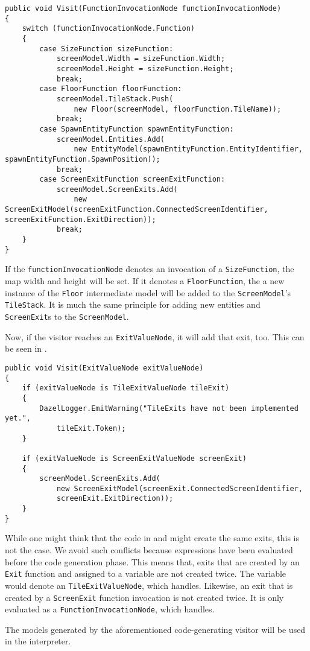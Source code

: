 \begin{lstlisting}[language=CSharp, caption={FunctionInvocationNode \texttt{Visit} method.}, label={lst:finVisitSG}]
public void Visit(FunctionInvocationNode functionInvocationNode)
{
    switch (functionInvocationNode.Function)
    {
        case SizeFunction sizeFunction:
            screenModel.Width = sizeFunction.Width;
            screenModel.Height = sizeFunction.Height;
            break;
        case FloorFunction floorFunction:
            screenModel.TileStack.Push(
                new Floor(screenModel, floorFunction.TileName));
            break;
        case SpawnEntityFunction spawnEntityFunction:
            screenModel.Entities.Add(
                new EntityModel(spawnEntityFunction.EntityIdentifier, spawnEntityFunction.SpawnPosition));
            break;
        case ScreenExitFunction screenExitFunction:
            screenModel.ScreenExits.Add(
                new ScreenExitModel(screenExitFunction.ConnectedScreenIdentifier, screenExitFunction.ExitDirection));
            break;
    }
}    
\end{lstlisting}

If the \texttt{functionInvocationNode} denotes an invocation of a \texttt{SizeFunction}, the map width and height will be set. If it denotes a \texttt{FloorFunction}, the a new instance of the \texttt{Floor} intermediate model will be added to the \texttt{ScreenModel}'s \texttt{TileStack}. It is much the same principle for adding new entities and \texttt{ScreenExit}s to the \texttt{ScreenModel}.

Now, if the visitor reaches an \texttt{ExitValueNode}, it will add that exit, too. This can be seen in  .

\begin{lstlisting}[label={lst:visitExitNodeSG}, caption={The visit method for \texttt{ExitValueNode.}}, language=CSharp]
public void Visit(ExitValueNode exitValueNode)
{
    if (exitValueNode is TileExitValueNode tileExit)
    {
        DazelLogger.EmitWarning("TileExits have not been implemented yet.", 
            tileExit.Token);
    }

    if (exitValueNode is ScreenExitValueNode screenExit)
    {
        screenModel.ScreenExits.Add(
            new ScreenExitModel(screenExit.ConnectedScreenIdentifier, 
            screenExit.ExitDirection));
    }
}
\end{lstlisting}

While one might think that the code in  and  might create the same exits, this is not the case. We avoid such conflicts because expressions have been evaluated before the code generation phase. This means that, exits that are created by an \texttt{Exit} function and assigned to a variable are not created twice. The variable would denote an \texttt{TileExitValueNode}, which  handles. Likewise, an exit that is created by a \texttt{ScreenExit} function invocation is not created twice. It is only evaluated as a \texttt{FunctionInvocationNode}, which  handles.


The models generated by the aforementioned code-generating visitor will be used in the \dazel{} interpreter.
